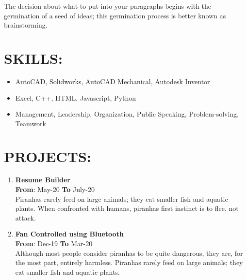 \documentclass{article}
\begin{document}
\begin{multicols}{2}
\begin{flushleft}
The decision about what to put into your paragraphs begins with the germination of a seed of ideas; this germination process is better known as brainstorming. 
\end{flushleft}

\vspace{3pt}
\section*{\large{\uppercase{Skills:}}}

\begin{flushleft}
\begin{itemize}[noitemsep,nolistsep]
	\item AutoCAD, Solidworks, AutoCAD Mechanical, Autodesk Inventor
	\item Excel, C++, HTML, Javascript, Python
	\item Management, Leadership, Organization, Public Speaking, Problem-solving, Teamwork
\end{itemize}
\end{flushleft}
\vspace{5pt}



\section*{\large{\uppercase{projects:}}}


\begin{enumerate}
	\item {\textbf{Resume Builder}}\\
	\hfill {\textbf{From}}: May-20 {\textbf{To}} July-20\\
	Piranhas rarely feed on large animals; they eat smaller fish and aquatic plants. When confronted with humans, piranhas first instinct is to flee, not attack. 
	\item {\textbf{Fan Controlled using Bluetooth}}\\
	\hfill {\textbf{From}}: Dec-19 {\textbf{To}} Mar-20\\
	Although most people consider piranhas to be quite dangerous, they are, for the most part, entirely harmless. Piranhas rarely feed on large animals; they eat smaller fish and aquatic plants.
\end{enumerate}


\end{multicols}
\end{document}
